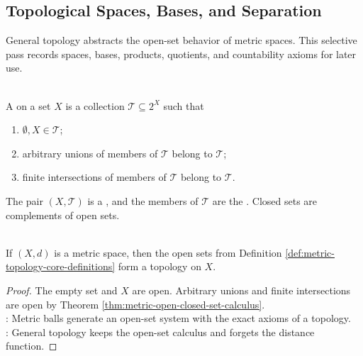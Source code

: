 \subsection{Topological Spaces, Bases, and Separation}

%


General topology abstracts the open-set behavior of metric spaces. This selective pass records spaces, bases, products, quotients, and countability axioms for later use.

\begin{definition} \label{def:topological-space} \\
A  on a set $X$ is a collection $\mathcal{T}\subseteq 2^X$ such that
\begin{enumerate}[label=(\roman*)]
\setlength{\itemsep}{0pt}
\item $\emptyset,X\in\mathcal{T}$;
\item arbitrary unions of members of $\mathcal{T}$ belong to $\mathcal{T}$;
\item finite intersections of members of $\mathcal{T}$ belong to $\mathcal{T}$.
\end{enumerate}
The pair $(X,\mathcal{T})$ is a , and the members of $\mathcal{T}$ are the . Closed sets are complements of open sets.
\end{definition}

\begin{proposition} \label{prop:metric-open-sets-form-topology} \\
If $(X,d)$ is a metric space, then the open sets from Definition \ref{def:metric-topology-core-definitions} form a topology on $X$.
\begin{proof}
The empty set and $X$ are open. Arbitrary unions and finite intersections are open by Theorem \ref{thm:metric-open-closed-set-calculus}.\\
: Metric balls generate an open-set system with the exact axioms of a topology.\\
: General topology keeps the open-set calculus and forgets the distance function.
\end{proof}
\end{proposition}

